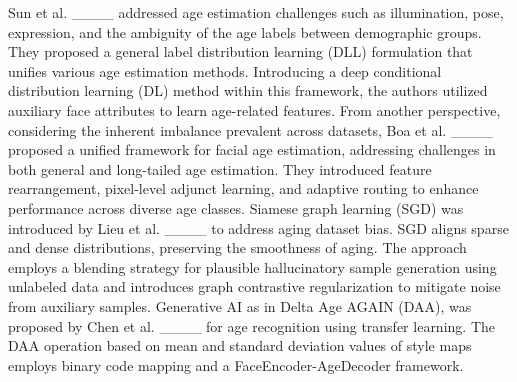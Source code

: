 Sun et al. ____ addressed age estimation challenges such as
illumination, pose, expression, and the ambiguity of the age labels between
demographic groups. They proposed a general label distribution learning (DLL)
formulation that unifies various age estimation methods. Introducing a deep
conditional distribution learning (DL) method within this framework, the
authors utilized auxiliary face attributes to learn age-related features. From
another perspective, considering the inherent imbalance prevalent across
datasets, Boa et al. ____ proposed a unified framework for
facial age estimation, addressing challenges in both general and long-tailed
age estimation. They introduced feature rearrangement, pixel-level adjunct
learning, and adaptive routing to enhance performance across diverse age
classes. Siamese graph learning (SGD) was introduced by Lieu et al.
____ to address aging dataset bias. SGD aligns sparse and dense
distributions, preserving the smoothness of aging. The approach employs a
blending strategy for plausible hallucinatory sample generation using
unlabeled data and introduces graph contrastive regularization to mitigate
noise from auxiliary samples. Generative AI as in Delta Age AGAIN (DAA), was
proposed by Chen et al. ____ for age recognition using transfer
learning. The DAA operation based on mean and standard deviation values of
style maps employs binary code mapping and a FaceEncoder-AgeDecoder framework.

